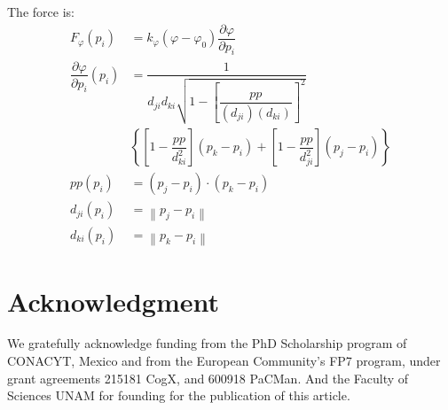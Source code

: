 \documentclass[journal]{IEEEtran}
\begin{document}
The force is:
\begin{align}
 F_\varphi(p_i) & = k_\varphi(\varphi - \varphi_0)\dfrac{\partial \varphi}{\partial p_i} \\
 \dfrac{\partial \varphi}{\partial p_i}(p_i) & =
    \dfrac{1}{d_{ji}d_{ki}\sqrt{1-\left[\dfrac{pp}{(d_{ji}) (d_{ki})}\right]^2}} \nonumber \\
 & \left\{\left[1-\dfrac{pp}{d_{ki}^2}\right](p_k-p_i)+\left[1-\dfrac{pp}{d_{ji}^2}\right](p_j-p_i) \right\} \nonumber \\
 pp(p_i) & =(p_j-p_i)\cdot(p_k-p_i) \nonumber \\
 d_{ji}(p_i) & = \left\| p_j-p_i \right\| \nonumber \\
 d_{ki}(p_i) & = \left\| p_k-p_i \right\|
\end{align}




\section*{Acknowledgment}

We gratefully acknowledge funding from the PhD Scholarship program of CONACYT, Mexico and from the European Community's FP7 program, under grant agreements 215181 CogX, and 600918 PaCMan.  And the Faculty of Sciences UNAM for founding for the publication of this article.


\ifCLASSOPTIONcaptionsoff
  \newpage
\fi


\balance



%


\end{document}
